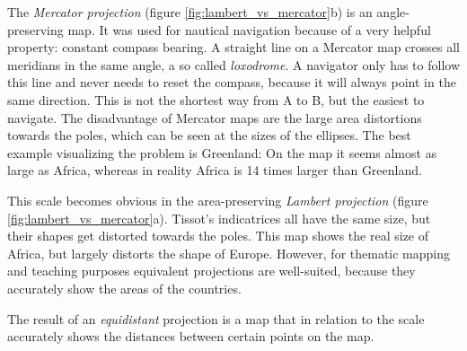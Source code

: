 \addtocounter{footnote}{-1}

\addtocounter{footnote}{1} %

The \emph{Mercator projection} (figure \ref{fig:lambert_vs_mercator}b) is an angle-preserving map. It was used for nautical navigation because of a very helpful property: constant compass bearing. A straight line on a Mercator map crosses all meridians in the same angle, a so called \emph{loxodrome}. A navigator only has to follow this line and never needs to reset the compass, because it will always point in the same direction. This is not the shortest way from A to B, but the easiest to navigate. The disadvantage of Mercator maps are the large area distortions towards the poles, which can be seen at the sizes of the ellipses. The best example visualizing the problem is Greenland: On the map it seems almost as large as Africa, whereas in reality Africa is 14 times larger than Greenland.
\cite{mapProjectionGeokov}

This scale becomes obvious in the area-preserving \emph{Lambert projection} (figure \ref{fig:lambert_vs_mercator}a). Tissot's indicatrices all have the same size, but their shapes get distorted towards the poles. This map shows the real size of Africa, but largely distorts the shape of Europe. However, for thematic mapping and teaching purposes equivalent projections are well-suited, because they accurately show the areas of the countries.
\cite{mapProjectionGeokov}

The result of an \emph{equidistant} projection is a map that in relation to the scale accurately shows the distances between certain points on the map.

